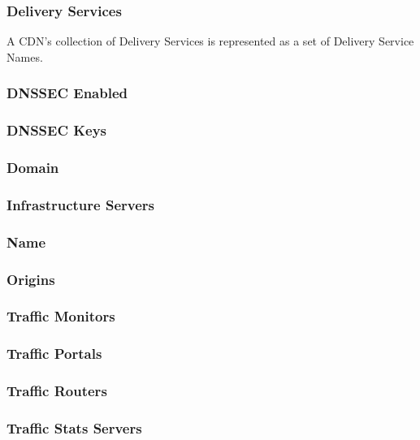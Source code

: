\subsubsection{Delivery Services}
A CDN's collection of Delivery Services is represented as a set of Delivery Service Names.

\subsubsection{DNSSEC Enabled}


\subsubsection{DNSSEC Keys}

\subsubsection{Domain}

\subsubsection{Infrastructure Servers}

\subsubsection{Name}

\subsubsection{Origins}

\subsubsection{Traffic Monitors}

\subsubsection{Traffic Portals}

\subsubsection{Traffic Routers}

\subsubsection{Traffic Stats Servers}

